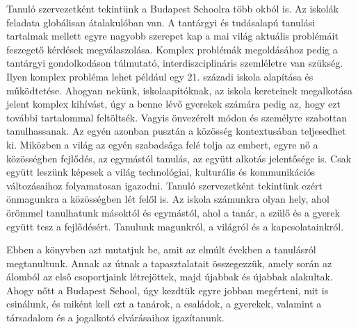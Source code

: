 Tanuló szervezetként tekintünk a Budapest Schoolra több okból is. Az
iskolák feladata globálisan átalakulóban van. A tantárgyi és
tudásalapú tanulási tartalmak mellett egyre nagyobb szerepet kap a mai
világ aktuális problémáit feszegető kérdések megválaszolása. Komplex
problémák megoldásához pedig a tantárgyi gondolkodáson túlmutató,
interdiszciplináris szemléletre van szükség. Ilyen komplex probléma
lehet például egy 21. századi iskola alapítása és működtetése. Ahogyan
nekünk, iskolaapítóknak, az iskola kereteinek megalkotása jelent
komplex kihívást, úgy a benne lévő gyerekek számára pedig az, hogy ezt
további tartalommal feltöltsék. Vagyis önvezérelt módon és személyre
szabottan tanulhassanak. Az egyén azonban pusztán a közösség
kontextusában teljesedhet ki. Miközben a világ az egyén szabadsága
felé tolja az embert, egyre nő a közösségben fejlődés, az egymástól
tanulás, az együtt alkotás jelentősége is. Csak együtt leszünk képesek
a világ technológiai, kulturális és kommunikációs változásaihoz
folyamatosan igazodni. Tanuló szervezetként tekintünk ezért önmagunkra
a közösségben lét felől is. Az iskola számunkra olyan hely, ahol
örömmel tanulhatunk másoktól és egymástól, ahol a tanár, a szülő és a
gyerek együtt tesz a fejlődésért. Tanulunk magunkról, a világról és a
kapcsolatainkról.


Ebben a könyvben azt mutatjuk be, amit az elmúlt években a tanulásról
megtanultunk. Annak az útnak a tapasztalatait összegezzük, amely során
az álomból az első csoportjaink létrejöttek, majd újabbak és újabbak
alakultak. Ahogy nőtt a Budapest School, úgy kezdtük egyre jobban
megérteni, mit is csinálunk, és miként kell ezt a tanárok, a családok,
a gyerekek, valamint a társadalom és a jogalkotó elvárásaihoz
igazítanunk.


